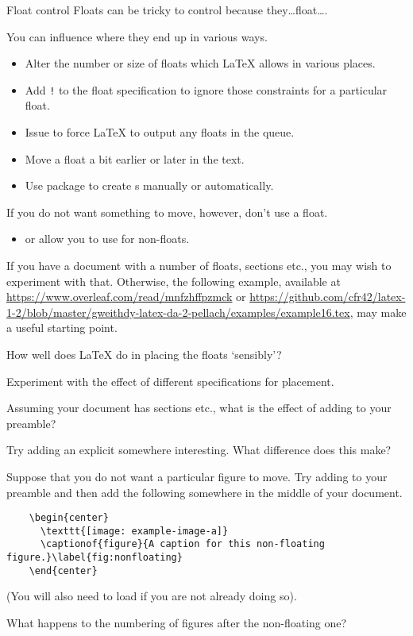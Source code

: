 \begin{frame}{Float control}
  Floats can be tricky to control because they\dots float\dots.
  
  You can influence where they end up in various ways.
  \begin{itemize}
    \item Alter the number or size of floats which \LaTeX{} allows in various places.
    \item Add \texttt{!} to the float specification to ignore those constraints for a particular float.
    \item Issue  to force \LaTeX{} to output any floats in the queue.
    \item Move a float a bit earlier or later in the text.
    \item Use package  to create s manually or automatically.
  \end{itemize}
  
  If you do not want something to move, however, don't use a float.
  \begin{itemize}
    \item {} or  allow you to use  for non-floats.
  \end{itemize}
\end{frame}

\begin{exercise}
  \label{ex:floatmanagement}%
  If you have a document with a number of floats, sections etc., you may wish to experiment with that.
  Otherwise, the following example, available at \url{https://www.overleaf.com/read/mnfzhffpzmck} or \url{https://github.com/cfr42/latex-1-2/blob/master/gweithdy-latex-da-2-pellach/examples/example16.tex}, may make a useful starting point.
  

  How well does \LaTeX{} do in placing the floats ‘sensibly’?

  Experiment with the effect of different specifications for placement.

  Assuming your document has sections etc., what is the effect of adding  to your preamble?

  Try adding an explicit  somewhere interesting.
  What difference does this make?

  Suppose that you do not want a particular figure to move.
  Try adding  to your preamble and then add the following somewhere in the middle of your document.
  \begin{verbatim}
    \begin{center}
      \texttt{[image: example-image-a]}
      \captionof{figure}{A caption for this non-floating figure.}\label{fig:nonfloating}
    \end{center}
  \end{verbatim}
  (You will also need to load  if you are not already doing so).

  What happens to the numbering of figures after the non-floating one?
\end{exercise}

